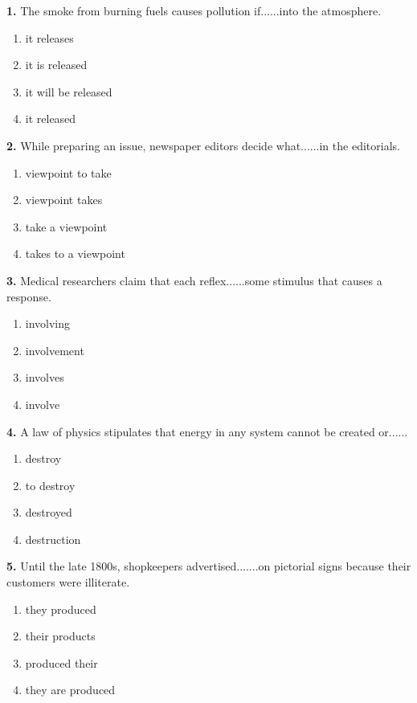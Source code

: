 \documentclass[12pt]{article}
\begin{document}
\noindent\textbf{1.} The smoke from burning fuels causes pollution if......into the atmosphere.
\begin{enumerate}[label=(\Alph*),leftmargin=*,itemsep=0.2em]
\item it releases
\item it is released
\item it will be released
\item it released
\end{enumerate}
\par
\vspace{0.25\baselineskip}
\noindent\textbf{2.} While preparing an issue, newspaper editors decide what......in the editorials.
\begin{enumerate}[label=(\Alph*),leftmargin=*,itemsep=0.2em]
\item viewpoint to take
\item viewpoint takes
\item take a viewpoint
\item takes to a viewpoint
\end{enumerate}
\par
\vspace{0.25\baselineskip}
\noindent\textbf{3.} Medical researchers claim that each reflex......some stimulus that causes a response.
\begin{enumerate}[label=(\Alph*),leftmargin=*,itemsep=0.2em]
\item involving
\item involvement
\item involves
\item involve
\end{enumerate}
\par
\vspace{0.25\baselineskip}
\noindent\textbf{4.} A law of physics stipulates that energy in any system cannot be created or......
\begin{enumerate}[label=(\Alph*),leftmargin=*,itemsep=0.2em]
\item destroy
\item to destroy
\item destroyed
\item destruction
\end{enumerate}
\par
\vspace{0.25\baselineskip}
\noindent\textbf{5.} Until the late 1800s, shopkeepers advertised.......on pictorial signs because their customers were illiterate.
\begin{enumerate}[label=(\Alph*),leftmargin=*,itemsep=0.2em]
\item they produced
\item their products
\item produced their
\item they are produced
\end{enumerate}
\end{document}
